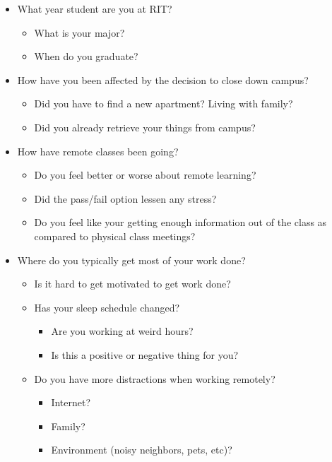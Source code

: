 \documentclass[12pt,
 reprint,
nofootinbib,
 amsmath,amssymb,
 aps,
]{revtex4-2}
\begin{document}
\begin{itemize}
    \item What year student are you at RIT?
    \begin{itemize}
        \item What is your major?
        \item When do you graduate?
    \end{itemize} 
    \item How have you been affected by the decision to close down campus?
    \begin{itemize}
        \item Did you have to find a new apartment? Living with family?
        \item Did you already retrieve your things from campus?
    \end{itemize}
    \item How have remote classes been going?
    \begin{itemize}
        \item Do you feel better or worse about remote learning?
        \item Did the pass/fail option lessen any stress?
        \item Do you feel like your getting enough information out of the class as compared to physical class meetings?
    \end{itemize}
    \item Where do you typically get most of your work done?
    \begin{itemize}
        \item Is it hard to get motivated to get work done?
        \item Has your sleep schedule changed?
            \begin{itemize}
                \item Are you working at weird hours?
                \item Is this a positive or negative thing for you?
            \end{itemize}
        \item Do you have more distractions when working remotely?
        \begin{itemize}
            \item Internet?
            \item Family?
            \item Environment (noisy neighbors, pets, etc)?
        \end{itemize}
    \end{itemize}

\end{itemize}
\end{document}
